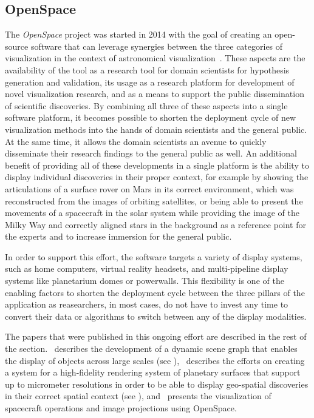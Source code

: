 \subsection{OpenSpace} \label{contributions:astro:openspace}
The \emph{OpenSpace} project was started in 2014 with the goal of creating an open-source software that can leverage synergies between the three categories of visualization in the context of astronomical visualization~\cite{bock17openspace}.  These aspects are the availability of the tool as a research tool for domain scientists for hypothesis generation and validation, its usage as a research platform for development of novel visualization research, and as a means to support the public dissemination of scientific discoveries.  By combining all three of these aspects into a single software platform, it becomes possible to shorten the deployment cycle of new visualization methods into the hands of domain scientists and the general public.  At the same time, it allows the domain scientists an avenue to quickly disseminate their research findings to the general public as well.  An additional benefit of providing all of these developments in a single platform is the ability to display individual discoveries in their proper context, for example by showing the articulations of a surface rover on Mars in its correct environment, which was reconstructed from the images of orbiting satellites, or being able to present the movements of a spacecraft in the solar system while providing the image of the Milky Way and correctly aligned stars in the background as a reference point for the experts and to increase immersion for the general public.

In order to support this effort, the software targets a variety of display systems, such as home computers, virtual reality headsets, and multi-pipeline display systems like planetarium domes or powerwalls.  This flexibility is one of the enabling factors to shorten the deployment cycle between the three pillars of the application as reasearchers, in most cases, do not have to invest any time to convert their data or algorithms to switch between any of the display modalities.

The papers that were published in this ongoing effort are described in the rest of the section.  \paperDSG\ describes the development of a dynamic scene graph that enables the display of objects across large scales (see ), \paperGB\ describes the efforts on creating a system for a high-fidelity rendering system of planetary surfaces that support up to micrometer resolutions in order to be able to display geo-spatial discoveries in their correct spatial context (see ), and \paperOS\ presents the visualization of spacecraft operations and image projections using OpenSpace.





